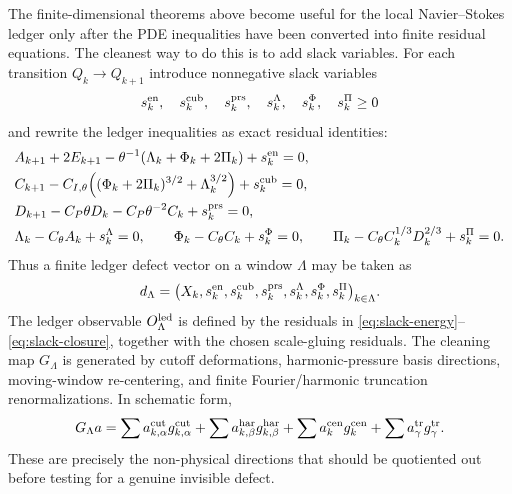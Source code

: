 \documentclass[11pt]{article}
\numberwithin{equation}{section}
\begin{document}
The finite-dimensional theorems above become useful for the local Navier--Stokes ledger only after the PDE inequalities have been converted into finite residual equations.  The cleanest way to do this is to add slack variables.  For each transition $Q_k\to Q_{k+1}$ introduce nonnegative slack variables
\[
    s_k^{\rm en},\quad s_k^{\rm cub},\quad s_k^{\rm prs},\quad
    s_k^{\Lambda},\quad s_k^{\Phi},\quad s_k^{\Pi}\ge0
\]
and rewrite the ledger inequalities as exact residual identities:
\begin{align}
    &A_{k+1}+2E_{k+1}
    -\theta^{-1}(\Lambda_k+\Phi_k+2\Pi_k)
    +s_k^{\rm en}=0,\label{eq:slack-energy}\\
    &C_{k+1}
    -C_{I,\theta}\Bigl((\Phi_k+2\Pi_k)^{3/2}+\Lambda_k^{3/2}\Bigr)
    +s_k^{\rm cub}=0,\label{eq:slack-cubic}\\
    &D_{k+1}-C_P\theta D_k-C_P\theta^{-2}C_k+s_k^{\rm prs}=0,\label{eq:slack-pressure}\\
    &\Lambda_k-C_\theta A_k+s_k^\Lambda=0,
    \qquad
    \Phi_k-C_\theta C_k+s_k^\Phi=0,
    \qquad
    \Pi_k-C_\theta C_k^{1/3}D_k^{2/3}+s_k^\Pi=0.\label{eq:slack-closure}
\end{align}
Thus a finite ledger defect vector on a window $\Lambda$ may be taken as
\[
    d_\Lambda
    =
    \bigl(
    X_k,
    s_k^{\rm en},s_k^{\rm cub},s_k^{\rm prs},
    s_k^\Lambda,s_k^\Phi,s_k^\Pi
    \bigr)_{k\in\Lambda}.
\]
The ledger observable $O_\Lambda^{\rm led}$ is defined by the residuals in
\eqref{eq:slack-energy}--\eqref{eq:slack-closure}, together with the chosen scale-gluing residuals.  The cleaning map $G_\Lambda$ is generated by cutoff deformations, harmonic-pressure basis directions, moving-window re-centering, and finite Fourier/harmonic truncation renormalizations.  In schematic form,
\[
    G_\Lambda a
    =
    \sum a_{k,\alpha}^{\rm cut}g_{k,\alpha}^{\rm cut}
    +
    \sum a_{k,\beta}^{\rm har}g_{k,\beta}^{\rm har}
    +
    \sum a_k^{\rm cen}g_k^{\rm cen}
    +
    \sum a_\gamma^{\rm tr}g_\gamma^{\rm tr}.
\]
These are precisely the non-physical directions that should be quotiented out before testing for a genuine invisible defect.
\end{document}
